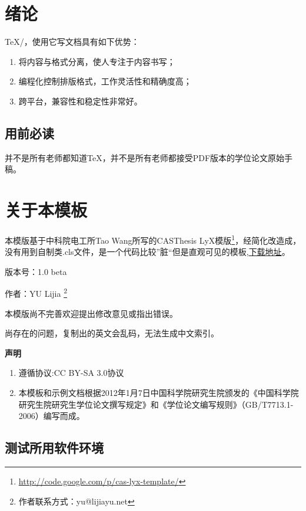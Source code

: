 \documentclass[a4paper,12pt,oneside,openany]{book}
\begin{document}
\begin{CJK}{UTF8}{hei}
\chapter[绪论]{绪论}

\TeX/，使用它写文档具有如下优势：
\begin{enumerate}
\item 将内容与格式分离，使人专注于内容书写；
\item 编程化控制排版格式，工作灵活性和精确度高；
\item 跨平台，兼容性和稳定性非常好。
\end{enumerate}

\section{用前必读}

并不是所有老师都知道\TeX，并不是所有老师都接受PDF版本的学位论文原始手稿。

\chapter{关于本模板}
本模版基于中科院电工所Tao Wang所写的CASThesis LyX模版\footnote{\href{http://code.google.com/p/cas-lyx-template/}{http://code.google.com/p/cas-lyx-template/}}，经简化改造成，没有用到自制类.cls文件，是一个代码比较”脏“但是直观可见的模板,\href{http://github.com/yulijia/LaTeX_UCASthesis}{下载地址}。

版本号：1.0 beta%

作者：YU Lijia%
\footnote{作者联系方式：yu@lijiayu.net%
}

本模版尚不完善欢迎提出修改意见或指出错误。

尚存在的问题，复制出的英文会乱码，无法生成中文索引。

\begin{center}
\textbf{声明}
\par\end{center}
\begin{enumerate}
\item 遵循协议:CC BY-SA 3.0协议
\item 本模板和示例文档根据2012年1月7日中国科学院研究生院颁发的《中国科学院研究生院研究生学位论文撰写规定》和《学位论文编写规则》（GB/T7713.1-2006）编写而成。
\end{enumerate}

\section{测试所用软件环境}


\end{CJK}
\end{document}
